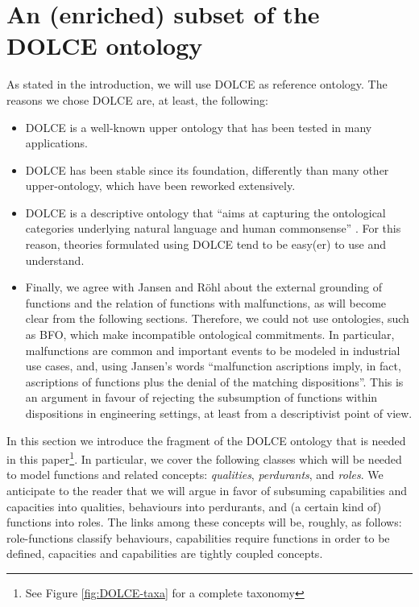 \documentclass[sw]{iosart2x}
\newcommand{\DOLCE}{\textsc{DOLCE}\xspace} %
\newcommand{\BFO}{\textsc{BFO}\xspace}
\newcommand{\firstTimeKeyWord}[1]{\textit{#1}}
\newcommand{\qquotes}[1]{``#1''}
\begin{document}
\section{An (enriched) subset of the \DOLCE ontology\label{sec:DOLCE}} 
As stated in the introduction, we will use \DOLCE as reference ontology. 
The reasons we chose \DOLCE are, at least, the following:
\begin{itemize}
  \item \DOLCE is a well-known upper ontology that has been tested in many applications.
  \item \DOLCE has been stable since its foundation, differently than many other upper-ontology, which have been reworked extensively.
  \item \DOLCE is a descriptive ontology that \qquotes{aims at capturing the ontological categories underlying natural language and human commonsense} \cite{masoloWonderWebDeliverableD182003}. 
  For this reason, theories formulated using \DOLCE tend to be easy(er) to use and understand.
  \item Finally, we agree with Jansen and Röhl \cite{rohlWhyFunctionsAre2014,jansenFunctionsMalfunctioningNegative2018} about the external grounding of functions and the relation of functions with malfunctions, as will become clear from the following sections. 
  Therefore, we could not use ontologies, such as \BFO, which make incompatible ontological commitments. 
  In particular, malfunctions are common and important events to be modeled in industrial use cases, and, using Jansen's words \cite{jansenFunctionsMalfunctioningNegative2018} \qquotes{malfunction ascriptions imply, in fact, ascriptions of functions plus the denial of the matching dispositions}. This is an argument in favour of rejecting the subsumption of functions within dispositions in engineering settings, at least from a descriptivist point of view.  
\end{itemize}

In this section we introduce the fragment of the \DOLCE ontology \cite{masoloWonderWebDeliverableD182003,borgoDOLCEDescriptiveOntology2022} that is needed in this paper\footnote{See Figure \ref{fig:DOLCE-taxa} for a complete taxonomy}. In particular, we cover the following classes which will be needed to model functions and related concepts: \firstTimeKeyWord{qualities}, \firstTimeKeyWord{perdurants}, and \firstTimeKeyWord{roles}. 
We anticipate to the reader that we will argue in favor of subsuming capabilities and capacities into qualities, behaviours into perdurants, and (a certain kind of) functions into roles. The links among these concepts will be, roughly, as follows: role-functions classify behaviours, capabilities require functions in order to be defined, capacities and capabilities are tightly coupled concepts.  
\end{document}
